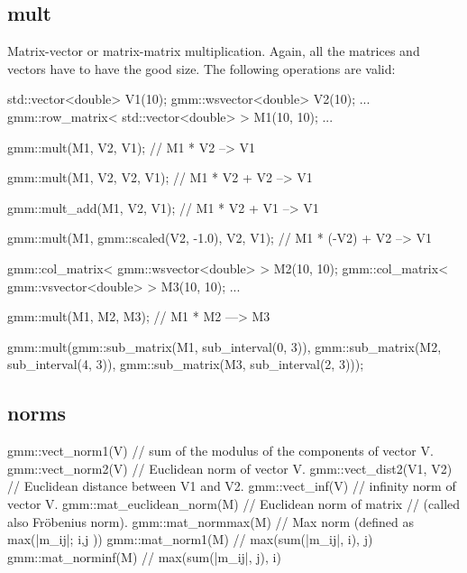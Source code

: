 \documentclass[11pt,a4paper]{article}
\begin{document}
\subsection{mult}
 
Matrix-vector or matrix-matrix multiplication. Again, all the matrices and vectors have to have the good size. The following operations are valid:
\begin{cppcode}
  std::vector<double> V1(10);
  gmm::wsvector<double> V2(10);
  ...
  gmm::row_matrix< std::vector<double> > M1(10, 10);
  ...

  gmm::mult(M1, V2, V1);  // M1 * V2 --> V1

  gmm::mult(M1, V2, V2, V1);  // M1 * V2 + V2 --> V1

  gmm::mult_add(M1, V2, V1);  // M1 * V2 + V1 --> V1

  gmm::mult(M1, gmm::scaled(V2, -1.0), V2, V1);  // M1 * (-V2) + V2 --> V1

  gmm::col_matrix< gmm::wsvector<double> > M2(10, 10);
  gmm::col_matrix< gmm::vsvector<double> > M3(10, 10);
  ...
  
  gmm::mult(M1, M2, M3); // M1 * M2 ---> M3
  
  gmm::mult(gmm::sub_matrix(M1, sub_interval(0, 3)),
            gmm::sub_matrix(M2, sub_interval(4, 3)),
            gmm::sub_matrix(M3, sub_interval(2, 3)));

\end{cppcode}

\subsection{norms}

\begin{cppcode}
  gmm::vect_norm1(V)  // sum of the modulus of the components of vector V.\\
  gmm::vect_norm2(V)  // Euclidean norm of vector V.
  gmm::vect_dist2(V1, V2)  // Euclidean distance between V1 and V2.
  gmm::vect_inf(V)    // infinity norm of vector V.
  gmm::mat_euclidean_norm(M) // Euclidean norm of matrix 
                             // (called also Fr\"obenius norm).
  gmm::mat_normmax(M) // Max norm (defined as max(|m_ij|; i,j ))
  gmm::mat_norm1(M)   // max(sum(|m_ij|, i), j)
  gmm::mat_norminf(M) // max(sum(|m_ij|, j), i)

\end{cppcode}
\end{document}
